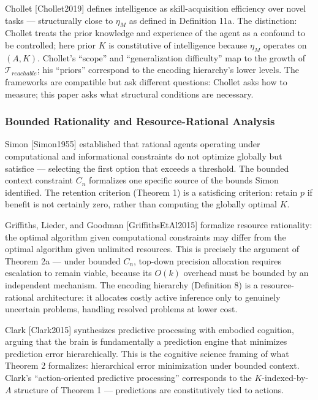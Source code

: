\documentclass[
]{article}
\begin{document}
Chollet {[}Chollet2019{]} defines intelligence as skill-acquisition
efficiency over novel tasks --- structurally close to \(\eta_M\) as
defined in Definition 11a. The distinction: Chollet treats the prior
knowledge and experience of the agent as a confound to be controlled;
here prior \(K\) is constitutive of intelligence because \(\eta_M\)
operates on \((A, K)\). Chollet's ``scope'' and ``generalization
difficulty'' map to the growth of \(\mathcal{T}_{reachable}\); his
``priors'' correspond to the encoding hierarchy's lower levels. The
frameworks are compatible but ask different questions: Chollet asks how
to measure; this paper asks what structural conditions are necessary.

\subsubsection{Bounded Rationality and Resource-Rational
Analysis}\label{bounded-rationality}

Simon {[}Simon1955{]} established that rational agents operating under
computational and informational constraints do not optimize globally but
satisfice --- selecting the first option that exceeds a threshold. The
bounded context constraint \(C_n\) formalizes one specific source of the
bounds Simon identified. The retention criterion (Theorem 1) is a
satisficing criterion: retain \(p\) if benefit is not certainly zero,
rather than computing the globally optimal \(K\).

Griffiths, Lieder, and Goodman {[}GriffithsEtAl2015{]} formalize
resource rationality: the optimal algorithm given computational
constraints may differ from the optimal algorithm given unlimited
resources. This is precisely the argument of Theorem 2a --- under
bounded \(C_n\), top-down precision allocation requires escalation to
remain viable, because its \(O(k)\) overhead must be bounded by an
independent mechanism. The encoding hierarchy
(Definition 8) is a resource-rational architecture: it allocates costly
active inference only to genuinely uncertain problems, handling resolved
problems at lower cost.

Clark {[}Clark2015{]} synthesizes predictive processing with embodied
cognition, arguing that the brain is fundamentally a prediction engine
that minimizes prediction error hierarchically. This is the cognitive
science framing of what Theorem 2 formalizes: hierarchical error
minimization under bounded context. Clark's ``action-oriented predictive
processing'' corresponds to the \(K\)-indexed-by-\(A\) structure of
Theorem 1 --- predictions are constitutively tied to actions.
\end{document}
